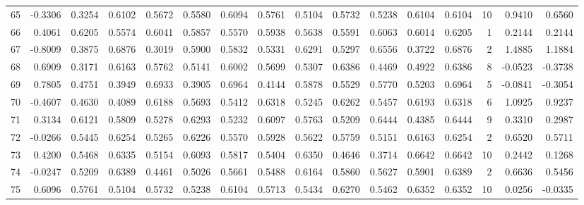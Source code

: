 \begin{tabular}{lrrrrrrrrrrrrrrr}
65  &     -0.3306 &  0.3254 &  0.6102 &  0.5672 &  0.5580 &  0.6094 &  0.5761 &  0.5104 &  0.5732 &  0.5238 &   0.6104 &     0.6104 &     10 &                    0.9410 &                     0.6560 \\
66  &      0.4061 &  0.6205 &  0.5574 &  0.6041 &  0.5857 &  0.5570 &  0.5938 &  0.5638 &  0.5591 &  0.6063 &   0.6014 &     0.6205 &      1 &                    0.2144 &                     0.2144 \\
67  &     -0.8009 &  0.3875 &  0.6876 &  0.3019 &  0.5900 &  0.5832 &  0.5331 &  0.6291 &  0.5297 &  0.6556 &   0.3722 &     0.6876 &      2 &                    1.4885 &                     1.1884 \\
68  &      0.6909 &  0.3171 &  0.6163 &  0.5762 &  0.5141 &  0.6002 &  0.5699 &  0.5307 &  0.6386 &  0.4469 &   0.4922 &     0.6386 &      8 &                   -0.0523 &                    -0.3738 \\
69  &      0.7805 &  0.4751 &  0.3949 &  0.6933 &  0.3905 &  0.6964 &  0.4144 &  0.5878 &  0.5529 &  0.5770 &   0.5203 &     0.6964 &      5 &                   -0.0841 &                    -0.3054 \\
70  &     -0.4607 &  0.4630 &  0.4089 &  0.6188 &  0.5693 &  0.5412 &  0.6318 &  0.5245 &  0.6262 &  0.5457 &   0.6193 &     0.6318 &      6 &                    1.0925 &                     0.9237 \\
71  &      0.3134 &  0.6121 &  0.5809 &  0.5278 &  0.6293 &  0.5232 &  0.6097 &  0.5763 &  0.5209 &  0.6444 &   0.4385 &     0.6444 &      9 &                    0.3310 &                     0.2987 \\
72  &     -0.0266 &  0.5445 &  0.6254 &  0.5265 &  0.6226 &  0.5570 &  0.5928 &  0.5622 &  0.5759 &  0.5151 &   0.6163 &     0.6254 &      2 &                    0.6520 &                     0.5711 \\
73  &      0.4200 &  0.5468 &  0.6335 &  0.5154 &  0.6093 &  0.5817 &  0.5404 &  0.6350 &  0.4646 &  0.3714 &   0.6642 &     0.6642 &     10 &                    0.2442 &                     0.1268 \\
74  &     -0.0247 &  0.5209 &  0.6389 &  0.4461 &  0.5026 &  0.5661 &  0.5488 &  0.6164 &  0.5860 &  0.5627 &   0.5901 &     0.6389 &      2 &                    0.6636 &                     0.5456 \\
75  &      0.6096 &  0.5761 &  0.5104 &  0.5732 &  0.5238 &  0.6104 &  0.5713 &  0.5434 &  0.6270 &  0.5462 &   0.6352 &     0.6352 &     10 &                    0.0256 &                    -0.0335 \\

\end{tabular}
